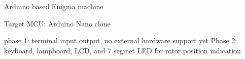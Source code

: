Arduino based Enigma machine

Target MCU\+: Arduino Nano clone

phase 1\+: terminal input output, no external hardware support yet Phase 2\+: keyboard, lampboard, LCD, and 7 segmet LED for rotor position indication 